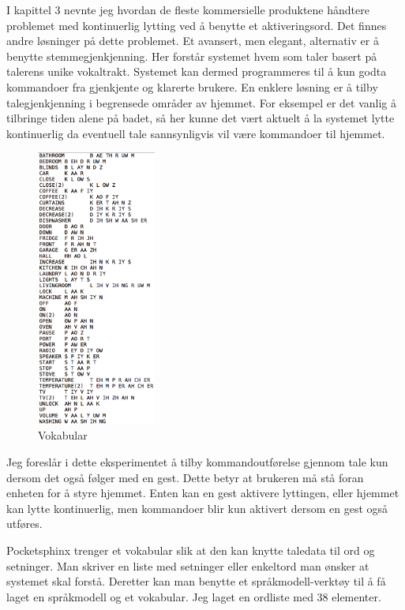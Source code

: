 I kapittel 3 nevnte jeg hvordan de fleste kommersielle produktene håndtere problemet med kontinuerlig lytting ved å benytte et aktiveringsord. Det finnes andre løsninger på dette problemet. Et avansert, men elegant, alternativ er å benytte stemmegjenkjenning. Her forstår systemet hvem som taler basert på talerens unike vokaltrakt. Systemet kan dermed programmeres til å kun godta kommandoer fra gjenkjente og klarerte brukere. En enklere løsning er å tilby talegjenkjenning i begrensede områder av hjemmet. For eksempel er det vanlig å tilbringe tiden alene på badet, så her kunne det vært aktuelt å la systemet lytte kontinuerlig da eventuell tale sannsynligvis vil være kommandoer til hjemmet.\begin{figure}
    \vspace{-20pt}
  \begin{center}
    \includegraphics[width=0.35\textwidth]{fig/dictionary}
  \end{center}
  \vspace{-20pt}
  \caption{Vokabular}
  \label{fig:vokabular}
  \vspace{-7pt}
\end{figure}Jeg foreslår i dette eksperimentet å tilby kommandoutførelse gjennom tale kun dersom det også følger med en gest. Dette betyr at brukeren må stå foran enheten for å styre hjemmet. Enten kan en gest aktivere lyttingen, eller hjemmet kan lytte kontinuerlig, men kommandoer blir kun aktivert dersom en gest også utføres.

Pocketsphinx trenger et vokabular slik at den kan knytte taledata til ord og setninger. Man skriver en liste med setninger eller enkeltord man ønsker at systemet skal forstå. Deretter kan man benytte et språkmodell-verktøy til å få laget en språkmodell og et vokabular. Jeg laget en ordliste med 38 elementer.

